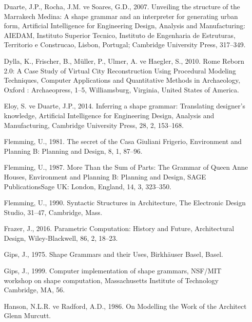 \documentclass[12pt,turkish,a4paperpaper,]{report}
\begin{document}
\leavevmode\hypertarget{ref-Duarte:2007eq}{}%
Duarte, J.P., Rocha, J.M. ve Soares, G.D., 2007. Unveiling the structure
of the Marrakech Medina: A shape grammar and an interpreter for
generating urban form, Artificial Intelligence for Engineering Design,
Analysis and Manufacturing: AIEDAM, Instituto Superior Tecnico,
Instituto de Engenharia de Estruturas, Territorio e Construcao, Lisbon,
Portugal; Cambridge University Press, 317--349.

\leavevmode\hypertarget{ref-Dylla:2010tm}{}%
Dylla, K., Frischer, B., Müller, P., Ulmer, A. ve Haegler, S., 2010.
Rome Reborn 2.0: A Case Study of Virtual City Reconstruction Using
Procedural Modeling Techniques, Computer Applications and Quantitative
Methods in Archaeology, Oxford : Archaeopress, 1--5, Williamsburg,
Virginia, United States of America.

\leavevmode\hypertarget{ref-Eloy:2014kn}{}%
Eloy, S. ve Duarte, J.P., 2014. Inferring a shape grammar: Translating
designer's knowledge, Artificial Intelligence for Engineering Design,
Analysis and Manufacturing, Cambridge University Press, 28, 2, 153--168.

\leavevmode\hypertarget{ref-Flemming:1981hm}{}%
Flemming, U., 1981. The secret of the Casa Giuliani Frigerio,
Environment and Planning B: Planning and Design, 8, 1, 87--96.

\leavevmode\hypertarget{ref-Flemming:1987js}{}%
Flemming, U., 1987. More Than the Sum of Parts: The Grammar of Queen
Anne Houses, Environment and Planning B: Planning and Design, SAGE
PublicationsSage UK: London, England, 14, 3, 323--350.

\leavevmode\hypertarget{ref-Flemming:1990tn}{}%
Flemming, U., 1990. Syntactic Structures in Architecture, The Electronic
Design Studio, 31--47, Cambridge, Mass.

\leavevmode\hypertarget{ref-Frazer:2016bs}{}%
Frazer, J., 2016. Parametric Computation: History and Future,
Architectural Design, Wiley-Blackwell, 86, 2, 18--23.

\leavevmode\hypertarget{ref-Gips:1975jg}{}%
Gips, J., 1975. Shape Grammars and their Uses, Birkhäuser Basel, Basel.

\leavevmode\hypertarget{ref-Gips:1999ut}{}%
Gips, J., 1999. Computer implementation of shape grammars, NSF/MIT
workshop on shape computation, Massachusetts Institute of Technology
Cambridge, MA, 56.

\leavevmode\hypertarget{ref-Hanson:1986ty}{}%
Hanson, N.L.R. ve Radford, A.D., 1986. On Modelling the Work of the
Architect Glenn Murcutt.
\end{document}
